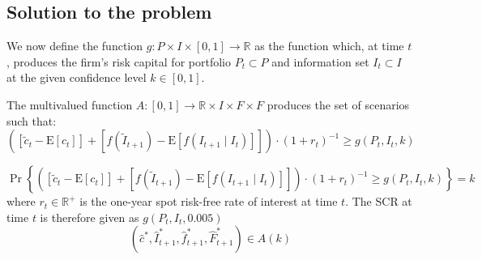 \subsection{Solution to the problem}
We now define the function $ g:P \times I \times \left[ 0,1 \right] \rightarrow
\mathbb R $ as the function which, at time $ t $, produces the firm's risk
capital for portfolio $ P_t \subset{P} $ and information set $ I_t \subset{I} $
at the given confidence level $ k \in{\left[ 0, 1 \right]} $.
\begin{definition}
The multivalued function $ A:\left[ 0,1 \right] \rightarrow \mathbb{R}
\times I \times F \times F $ produces the set of scenarios such that:
\begin{equation}
\left( \left[ \tilde{c}_t - \mathrm{E} \left[ c_t \right] \right]
+ \left[ f \left( \tilde{I}_{t+1} \right) - \mathrm{E} \left[ f \left( I_{t+1}
\mid I_t \right) \right] \right] \right) \cdot \left( 1 + r_t \right) ^ {-1}
\geq g \left( P_t, I_t, k \right)
\end{equation}
\end{definition}
\begin{equation}
\Pr \left\{ \left( \left[ \tilde{c}_t - \mathrm{E} \left[ c_t \right] \right]
+ \left[ f \left( \tilde{I}_{t+1} \right) - \mathrm{E} \left[ f \left( I_{t+1}
\mid I_t \right) \right] \right] \right) \cdot \left( 1 + r_t \right) ^ {-1}
\geq g \left( P_t, I_t, k \right) \right\} = k
\end{equation}
where $ r_t \in{\mathbb{R ^ +}} $ is the one-year spot risk-free rate of
interest at time $ t $. The SCR at time $ t $ is therefore given as
$ g \left( P_t, I_t, 0.005 \right) $
%
\begin{equation}
\left( \hat{c}^*, \hat{I}^*_{t+1}, \hat{f}^*_{t+1}, \hat{F}^*_{t+1} \right)
\in A \left( k \right)
\end{equation}
